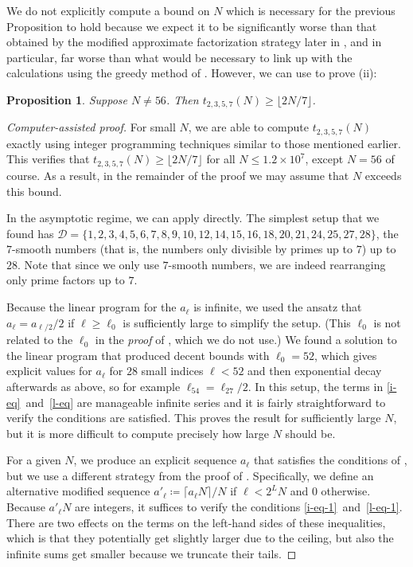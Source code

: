 \documentclass[12pt,a4paper,reqno]{amsart}
\numberwithin{equation}{section}
\theoremstyle{plain}
\newtheorem{proposition}[theorem]{Proposition}
\theoremstyle{definition}
\begin{document}
We do not explicitly compute a bound on $N$ which is necessary for the previous Proposition to hold because we expect it to be significantly worse than that obtained by the modified approximate factorization strategy later in , and in particular, far worse than what would be necessary to link up with the calculations using the greedy method of .
However, we can use  to prove (ii):
\begin{proposition}\label{two-sevenths} Suppose $N\ne 56$.  Then $t_{2,3,5,7}(N) \ge \lfloor 2N/7\rfloor$.
\end{proposition}
\begin{proof}[Computer-assisted proof]
For small $N$, we are able to compute $t_{2,3,5,7}(N)$ exactly using integer programming techniques similar to those mentioned earlier.
This verifies that $t_{2,3,5,7}(N)\ge \lfloor 2N/7\rfloor$ for all $N\le 1.2\times 10^7$, except $N=56$ of course.
As a result, in the remainder of the proof we may assume that $N$ exceeds this bound.

In the asymptotic regime, we can apply  directly.
The simplest setup that we found has $\mathcal{D}=\{1,2,3,4,5,6,7,8,9,10,12,14,15,16,18,20,21,24,25,27,28\}$, the $7$-smooth numbers (that is, the numbers only divisible by primes up to $7$) up to $28$.
Note that since we only use $7$-smooth numbers, we are indeed rearranging only prime factors up to $7$.

Because the linear program for the $a_\ell$ is infinite, we used the ansatz that $a_\ell = a_{\ell/2}/2$ if $\ell\ge \ell_0$ is sufficiently large to simplify the setup.
(This $\ell_0$ is not related to the $\ell_0$ in the \emph{proof} of , which we do not use.)
We found a solution to the linear program that produced decent bounds with $\ell_0 = 52$, which gives explicit values for $a_\ell$ for $28$ small indices $\ell<52$ and then exponential decay afterwards as above, so for example $\ell_{54}=\ell_{27}/2$.
In this setup, the terms in \eqref{i-eq}~and~\eqref{l-eq} are manageable infinite series and it is fairly straightforward to verify the conditions are satisfied.
This proves the result for sufficiently large $N$, but it is more difficult to compute precisely how large $N$ should be.

For a given $N$, we produce an explicit sequence $a_\ell$ that satisfies the conditions of , but we use a different strategy from the proof of .
Specifically, we define an alternative modified sequence $ a'_\ell \coloneqq \lceil a_\ell N \rceil/N$ if $\ell < 2^L N$ and $0$ otherwise.
Because $a'_\ell N$ are integers, it suffices to verify the conditions \eqref{i-eq-1}~and~\eqref{l-eq-1}.
There are two effects on the terms on the left-hand sides of these inequalities, which is that they potentially get slightly larger due to the ceiling, but also the infinite sums get smaller because we truncate their tails.


\end{proof}
\end{document}
